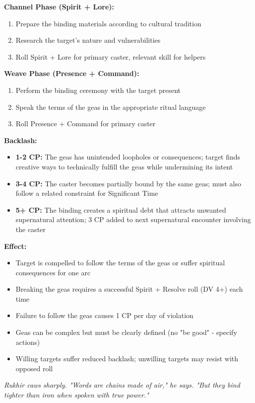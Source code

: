 \documentclass[12pt,twoside]{book}
\newcommand{\shadow}[1]{\textit{#1}}
\begin{document}
\textbf{Channel Phase (Spirit + Lore):}
\begin{enumerate}
\item Prepare the binding materials according to cultural tradition
\item Research the target's nature and vulnerabilities
\item Roll Spirit + Lore for primary caster, relevant skill for helpers
\end{enumerate}

\textbf{Weave Phase (Presence + Command):}
\begin{enumerate}
\item Perform the binding ceremony with the target present
\item Speak the terms of the geas in the appropriate ritual language
\item Roll Presence + Command for primary caster
\end{enumerate}

\textbf{Backlash:}
\begin{itemize}
\item \textbf{1-2 CP:} The geas has unintended loopholes or consequences; target finds creative ways to technically fulfill the geas while undermining its intent
\item \textbf{3-4 CP:} The caster becomes partially bound by the same geas; must also follow a related constraint for Significant Time
\item \textbf{5+ CP:} The binding creates a spiritual debt that attracts unwanted supernatural attention; 3 CP added to next supernatural encounter involving the caster
\end{itemize}

\textbf{Effect:}
\begin{itemize}
\item Target is compelled to follow the terms of the geas or suffer spiritual consequences for one arc
\item Breaking the geas requires a successful Spirit + Resolve roll (DV 4+) each time
\item Failure to follow the geas causes 1 CP per day of violation
\item Geas can be complex but must be clearly defined (no "be good" - specify actions)
\item Willing targets suffer reduced backlash; unwilling targets may resist with opposed roll
\end{itemize}

\shadow{Rukhir caws sharply. "Words are chains made of air," he says. "But they bind tighter than iron when spoken with true power."}
\end{document}
